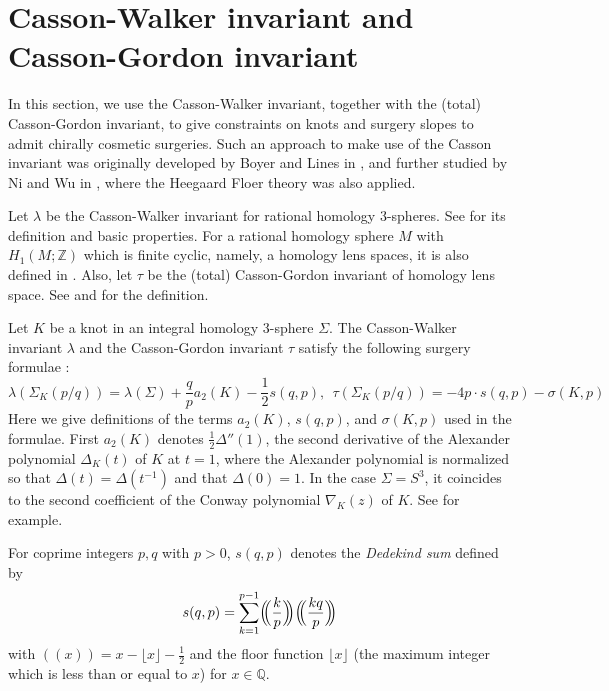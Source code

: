 \documentclass{amsart}
\theoremstyle{remark}
\theoremstyle{definition}
\begin{document}
\section{Casson-Walker invariant and Casson-Gordon invariant}\label{sec:Casson}

In this section, we use the Casson-Walker invariant, together with the (total) Casson-Gordon invariant, 
to give constraints on knots and surgery slopes to admit chirally cosmetic surgeries. 
Such an approach to make use of the Casson invariant was originally developed by Boyer and Lines in \cite{BoyerLines}, and further studied by Ni and Wu in \cite{NiWu}, 
where the Heegaard Floer theory was also applied. 


Let $\lambda$ be the Casson-Walker invariant for rational homology 3-spheres. 
See \cite{Walker} for its definition and basic properties. 
For a rational homology sphere $M$ with $H_{1}(M;\mathbb{Z})$ which is finite cyclic, namely, a homology lens spaces, it is also defined in \cite{BoyerLines}. 
Also, let $\tau$ be the (total) Casson-Gordon invariant of homology lens space. See \cite[Definition 2.20]{BoyerLines} and \cite{CassonGordon} for the definition. 


Let $K$ be a knot in an integral homology 3-sphere $\Sigma$. 
The Casson-Walker invariant $\lambda$ and the Casson-Gordon invariant $\tau$ satisfy the following surgery formulae \cite{BoyerLines,Walker}:  
\[ \lambda(\Sigma_{K}(p\slash q)) =  \lambda(\Sigma) + \frac{q}{p} a_{2}(K) - \frac{1}{2}s(q,p), \ \  \tau(\Sigma_{K}(p\slash q)) = -4p \cdot s(q,p) - \sigma(K,p)
 \]
Here we give definitions of the terms $a_{2}(K)$, $s(q,p)$, and $\sigma(K,p)$ used in the formulae. 
First  $a_2 (K)$ denotes $\frac{1}{2}\Delta''(1)$, the second derivative of the Alexander polynomial $\Delta_{K}(t)$ of $K$ at $t=1$, 
where the Alexander polynomial is normalized so that $\Delta(t)=\Delta(t^{-1})$ and that $\Delta(0)=1$. 
In the case $\Sigma=S^{3}$, it coincides to the second coefficient of the Conway polynomial $\nabla_{K}(z)$ of $K$. 
See \cite{AkbulutMcCarthy} for example. 
 
For coprime integers $p,q$ with $p>0$, $s(q,p)$ denotes the \emph{Dedekind sum} defined by
\[ s(q,p) = \sum_{k=1}^{p-1}\Bigl(\!\!\Bigl( \frac{k}{p}\Bigr)\!\!\Bigr)\Bigl(\!\!\Bigl( \frac{kq}{p}\Bigr)\!\!\Bigr) \]
with $(\!(x)\!) = x -\lfloor x \rfloor -\frac{1}{2}$ and the floor function $\lfloor x \rfloor$ (the maximum integer which is less than or equal to $x$) for $x \in \mathbb{Q}$. 
\end{document}
